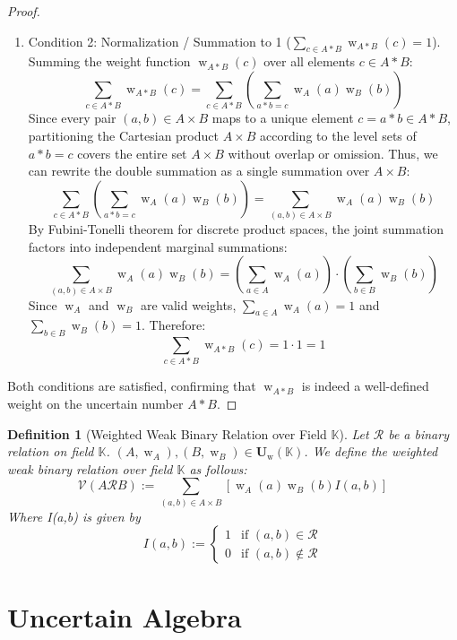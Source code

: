 \documentclass[a4paper,12pt, twoside]{memoir}
\newtheorem{definition}{Definition}[chapter]
\DeclareMathOperator{\w}{w}
\newcommand{\tsbdts}[1]{\mathbf{U}_{\w}(\mathbb{#1})} %
\newcommand{\ddclmd}{\mathcal{V}} %
\newcommand{\ts}[1]{\w_{#1}} %
\begin{document}
\begin{proof}
\begin{enumerate}[leftmargin=*]
		\item Condition 2: Normalization / Summation to 1 ($\sum_{c \in A*B} \ts{A*B}(c) = 1$). \\
		      Summing the weight function $\ts{A*B}(c)$ over all elements $c \in A * B$:
		      \[
			      \sum_{c \in A*B} \ts{A*B}(c) = \sum_{c \in A*B} \left( \sum_{a*b=c} \ts{A}(a)\ts{B}(b) \right)
		      \]
		      Since every pair $(a, b) \in A \times B$ maps to a unique element $c = a * b \in A * B$, partitioning the Cartesian product $A \times B$ according to the level sets of $a * b = c$ covers the entire set $A \times B$ without overlap or omission. Thus, we can rewrite the double summation as a single summation over $A \times B$:
		      \[
			      \sum_{c \in A*B} \left( \sum_{a*b=c} \ts{A}(a)\ts{B}(b) \right) = \sum_{(a, b) \in A \times B} \ts{A}(a)\ts{B}(b)
		      \]
		      By Fubini-Tonelli theorem for discrete product spaces, the joint summation factors into independent marginal summations:
		      \[
			      \sum_{(a, b) \in A \times B} \ts{A}(a)\ts{B}(b) = \left( \sum_{a \in A} \ts{A}(a) \right) \cdot \left( \sum_{b \in B} \ts{B}(b) \right)
		      \]
		      Since $\ts{A}$ and $\ts{B}$ are valid weights, $\sum_{a \in A} \ts{A}(a) = 1$ and $\sum_{b \in B} \ts{B}(b) = 1$. Therefore:
		      \[
			      \sum_{c \in A*B} \ts{A*B}(c) = 1 \cdot 1 = 1
		      \]
	\end{enumerate}

	Both conditions are satisfied, confirming that $\ts{A*B}$ is indeed a well-defined weight on the uncertain number $A * B$.
\end{proof}
\begin{definition}[Weighted Weak Binary Relation over Field $\mathbb{K}$]
	Let $\mathcal{R}$ be a binary relation on field $\mathbb{K}$. $(A,\ts{A}),(B,\ts{B}) \in \tsbdts{K}$. We define the weighted weak binary relation over field $\mathbb{K}$ as follows:
	\[\ddclmd(A\mathcal{R}B) := \sum_{(a,b) \in A \times B}{\left[\ts{A}(a)\ts{B}(b)I(a,b)\right]}\]
	Where I(a,b) is given by
	\[
		I(a,b) := \begin{cases}
			1 & \text{if } (a,b) \in \mathcal{R}    \\
			0 & \text{if } (a,b) \notin \mathcal{R}
		\end{cases}
	\]
\end{definition}

\chapter{Uncertain Algebra}
\end{document}
